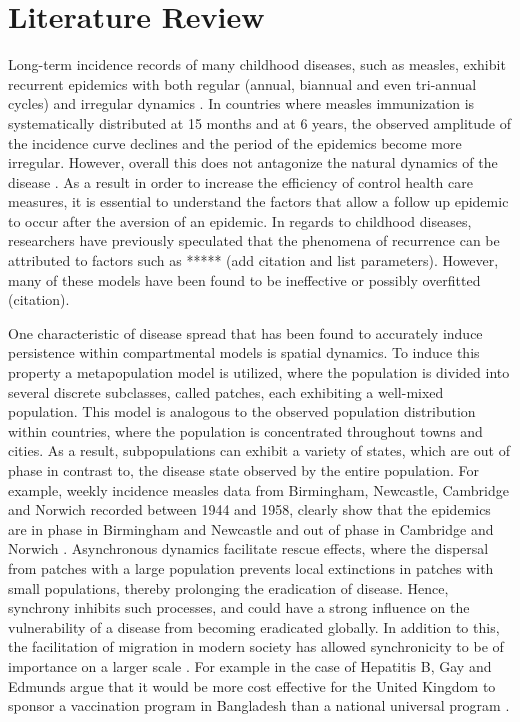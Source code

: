 \documentclass[twocolumn,nofootinbib,showkeys,twoside,floatfix,unsortedaddress,flushbottom,10pt,aps,pra]{report}
\begin{document}
\section{Literature Review }
Long-term incidence records of many childhood diseases, such as measles, exhibit recurrent epidemics with  both regular (annual, biannual and even tri-annual cycles) and irregular dynamics \cite{Earn2000}. In countries where measles immunization is systematically distributed at 15 months and at 6 years, the observed amplitude of the incidence curve declines and the period of the epidemics become more irregular. However, overall this does not antagonize the natural dynamics of the disease \cite{Samanta2014,Earn2000}. As a result in order to increase the efficiency of control health care measures, it is essential to understand the factors that allow a follow up epidemic to occur after the aversion of an epidemic. In regards to childhood diseases, researchers have previously speculated that the phenomena of recurrence can be attributed to factors such as ***** (add citation and list parameters). However, many of these models have been found to be ineffective or possibly overfitted (citation). 
\par
\smallskip \qquad
One characteristic of disease spread that has been found to accurately induce persistence within compartmental models is spatial dynamics. To induce this property a metapopulation model is utilized, where the population is divided into several discrete subclasses, called patches, each exhibiting a well-mixed population. This model is analogous to the observed population distribution within countries, where the population is concentrated throughout towns and cities. As a result, subpopulations can exhibit a variety of states, which are out of phase in contrast to, the disease state observed by the entire population. For example, weekly incidence measles data from Birmingham, Newcastle, Cambridge and Norwich recorded between 1944 and 1958, clearly show that the epidemics are in phase in Birmingham and Newcastle and out of phase in Cambridge and Norwich \cite{Grenfell2001}.  Asynchronous dynamics facilitate rescue effects, where the dispersal from patches with a large population prevents local extinctions in patches with small populations, thereby prolonging the eradication of disease. Hence, synchrony inhibits such processes, and could have a strong inﬂuence on the vulnerability of a disease from becoming eradicated globally. In addition to this, the facilitation of migration in modern society has allowed synchronicity to be of importance on a larger scale \cite{McCluskley2014}. For example in the case of Hepatitis B, Gay and Edmunds argue that it would be more cost effective for the United Kingdom to sponsor a vaccination program in Bangladesh than a national universal program \cite{Burton2012}. 
\end{document}
